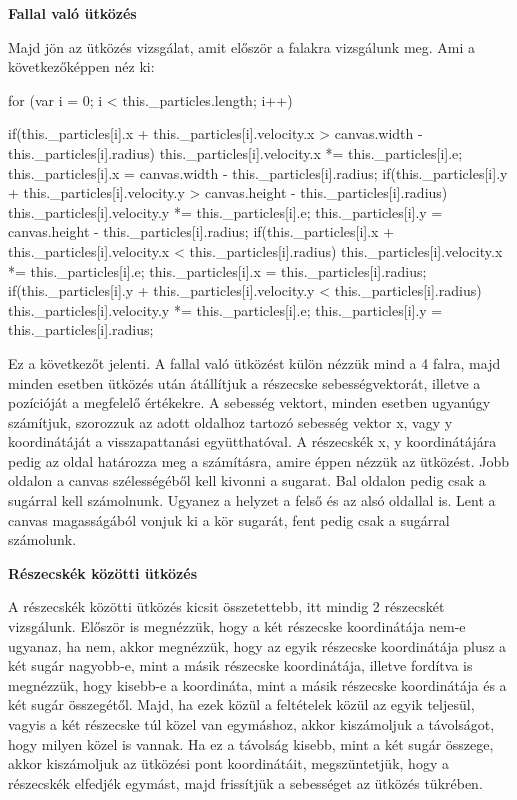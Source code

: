 \textbf{Fallal való ütközés}
\cite{bounce}
\cite{game}

Majd jön az ütközés vizsgálat, amit először a falakra vizsgálunk meg. Ami a következőképpen néz ki:
\begin{java}
	for (var i = 0; i < this._particles.length; i++) {
		if(this._particles[i].x 
		+ this._particles[i].velocity.x 
		> canvas.width 
		- this._particles[i].radius)
		{
			this._particles[i].velocity.x 
			*= this._particles[i].e;
			this._particles[i].x 
			= canvas.width 
			- this._particles[i].radius;
		}
		if(this._particles[i].y 
		+ this._particles[i].velocity.y 
		> canvas.height 
		- this._particles[i].radius)
		{
			this._particles[i].velocity.y 
			*= this._particles[i].e;
			this._particles[i].y 
			= canvas.height 
			- this._particles[i].radius;
		}
		if(this._particles[i].x 
		+ this._particles[i].velocity.x 
		< this._particles[i].radius)
		{
			this._particles[i].velocity.x 
			*= this._particles[i].e;
			this._particles[i].x 
			= this._particles[i].radius;
		}
		if(this._particles[i].y 
		+ this._particles[i].velocity.y 
		< this._particles[i].radius)
		{
			this._particles[i].velocity.y 
			*= this._particles[i].e;
			this._particles[i].y 
			= this._particles[i].radius;
		}
		
	}
\end{java}
Ez a következőt jelenti. A fallal való ütközést külön nézzük mind a 4 falra, majd minden esetben ütközés után átállítjuk a részecske sebességvektorát, illetve a pozícióját a megfelelő értékekre. A sebesség vektort, minden esetben ugyanúgy számítjuk, szorozzuk az adott oldalhoz tartozó sebesség vektor x, vagy y koordinátáját a visszapattanási együtthatóval. A részecskék x, y koordinátájára pedig az oldal határozza meg a számításra, amire éppen nézzük az ütközést. Jobb oldalon a canvas szélességéből kell kivonni a sugarat. Bal oldalon pedig csak a sugárral kell számolnunk. Ugyanez a helyzet a felső és az alsó oldallal is. Lent a canvas magasságából vonjuk ki a kör sugarát, fent pedig csak a sugárral számolunk.

\textbf{Részecskék közötti ütközés}

A részecskék  közötti ütközés kicsit összetettebb, itt mindig 2 részecskét vizsgálunk. Először is megnézzük, hogy a két részecske koordinátája nem-e ugyanaz, ha nem, akkor megnézzük, hogy az egyik részecske koordinátája plusz a két sugár nagyobb-e, mint a másik részecske koordinátája, illetve fordítva is megnézzük, hogy kisebb-e a koordináta, mint a másik részecske koordinátája és a két sugár összegétől. Majd, ha ezek közül a feltételek közül az egyik teljesül, vagyis a két részecske túl közel van egymáshoz, akkor kiszámoljuk a távolságot, hogy milyen közel is vannak. Ha ez a távolság kisebb, mint a két sugár összege, akkor kiszámoljuk az ütközési pont koordinátáit, megszüntetjük, hogy a részecskék elfedjék egymást, majd frissítjük a sebességet az ütközés tükrében.

